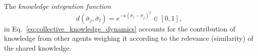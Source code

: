 \documentclass[12pt]{article}
\renewcommand{\emph}[1]{\textit{#1}}
\begin{document}
The \emph{knowledge integration function} 
\begin{equation}\label{eq:knowledge_integration_function}
	d(\bar{\sigma}_j,\bar{\sigma}_l) = e^{-a\left(\bar{\sigma}_l-\bar{\sigma}_j\right)^2}\in [0,1],
\end{equation}
\noindent in Eq.~\eqref{eq:collective_knowledge_dynamics} accounts for the contribution of knowledge from other agents weighing it according to the relevance (similarity) of the shared knowledge. 
\end{document}
